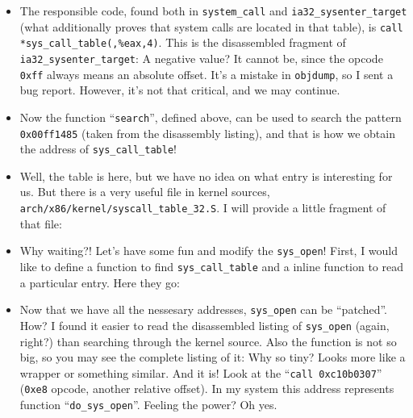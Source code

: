 \documentclass[12pt]{article}
\begin{document}
  \begin{itemize}
  \item The responsible code, found both in \verb!system_call! and
    \verb!ia32_sysenter_target! (what additionally proves that system calls
    are located in that table), is \verb!call *sys_call_table(,%eax,4)!. This
    is the disassembled fragment of \verb!ia32_sysenter_target!:
     A negative value?  It cannot be, since the
    opcode \verb!0xff! always means an absolute offset. It's a mistake in
    \verb!objdump!, so I sent a bug report. However, it's not that critical,
    and we may continue.

  \item Now the function ``\verb!search!'', defined above, can be used to
    search the pattern \verb!0x00ff1485! (taken from the disassembly listing),
    and that is how we obtain the address of \verb!sys_call_table!!

  \item Well, the table is here, but we have no idea on what entry is
    interesting for us. But there is a very useful file in kernel sources,
    \verb!arch/x86/kernel/syscall_table_32.S!. I will provide a little
    fragment of that file: 

  \item Why waiting?! Let's have some fun and modify the \verb!sys_open!!
    First, I would like to define a function to find \verb!sys_call_table! and
    a inline function to read a particular entry. Here they go:
    

  \item Now that we have all the nessesary addresses, \verb!sys_open! can be
    ``patched''. How? I found it easier to read the disassembled listing of
    \verb!sys_open! (again, right?) than searching through the kernel
    source. Also the function is not so big, so you may see the complete
    listing of it:  Why so tiny? Looks more like a
    wrapper or something similar. And it is! Look at the
    ``\verb!call 0xc10b0307!'' (\verb!0xe8! opcode, another relative
    offset). In my system this address represents function
    ``\verb!do_sys_open!''. Feeling the power? Oh yes.


\end{itemize}
\end{document}

